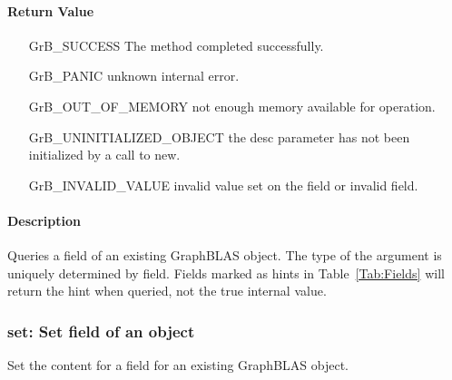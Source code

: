 \paragraph{Return Value}

\begin{itemize}[leftmargin=2.1in]
\item[{\sf GrB\_SUCCESS}]  The method completed successfully.
\item[{\sf GrB\_PANIC}]             unknown internal error.
\item[{\sf GrB\_OUT\_OF\_MEMORY}]          not enough memory available for operation.
\item[{\sf GrB\_UNINITIALIZED\_OBJECT}]          the {\sf desc} parameter has not been
                                    initialized by a call to {\sf new}.
\item[{\sf GrB\_INVALID\_VALUE}]    invalid value set on the field or invalid field.
\end{itemize}

\paragraph{Description}

Queries a field of an existing GraphBLAS object. %
The type of the argument is uniquely determined by {\sf field}. 
Fields marked as hints in Table~\ref{Tab:Fields} will return the hint when queried, not
the true internal value.

\subsubsection{{\sf set}: Set field of an object}

Set the content for a field for an existing GraphBLAS object.

\paragraph{\syntax}

